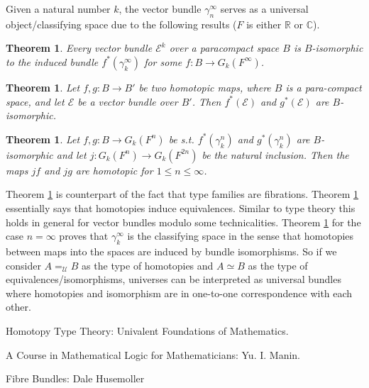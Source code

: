 \documentclass[10pt]{article}
\theoremstyle{definition}
\theoremstyle{plain}
\newtheorem{theorem}[definition]{Theorem}
\theoremstyle{remark}
\newcommand{\U}{\mathscr{U}}
\begin{document}
Given a natural number $k$, the vector bundle $\gamma^{\infty }_n$ serves as a 
universal object/classifying space due to the following results 
($F$ is either $\mathbb{R}$ or $\mathbb{C}$).

\begin{theorem}\label{T:Ind}
Every vector bundle $\mathscr{E}^k$ over a paracompact space $B$ is $B$-isomorphic
to the induced bundle $f^*(\gamma^{\infty}_k)$ for some ${f : B \to G_k (F^{ \infty })}$.
\end{theorem}

\begin{theorem}\label{T:Hom to Eq}
Let $f, g: B \to B'$ be two homotopic maps, where $B$ is a para-compact space, 
and let $\mathscr{E}$ be a vector bundle over $B'$. Then $f^*(\mathscr{E})$ and 
$g^*(\mathscr{E})$ are $B$-isomorphic.
\end{theorem}

\begin{theorem}\label{T:Eq to Hom}
Let $f, g: B \to G_k(F^n)$ be s.t. $f^*(\gamma_k^n)$ and $g^*(\gamma_k^n)$
are $B$-isomorphic and let ${ j: G_k(F^n) \to G_k(F^{2n}) }$ be the natural inclusion. Then the
maps $jf$ and $jg$ are homotopic for $1 \leq n \leq \infty$. 
\end{theorem}

Theorem \ref{T:Ind} is counterpart of the fact that type families are fibrations. Theorem
\ref{T:Hom to Eq} essentially says that homotopies induce equivalences. Similar to type theory
this holds in general for vector bundles modulo some technicalities. Theorem \ref{T:Eq to Hom}
for the case $n = \infty$ proves that $\gamma^{\infty}_k$ is the classifying space in the 
sense that homotopies between maps into the spaces are induced by bundle isomorphisms.
So if we consider $A =_{\U} B$ as the type of homotopies and $A \simeq B$ as the type of
equivalences/isomorphisms, universes can be interpreted as universal bundles where homotopies
and isomorphism are in one-to-one correspondence with each other.
 


\begin{thebibliography}{99}

Homotopy Type Theory: Univalent Foundations of Mathematics.

A Course in Mathematical Logic for Mathematicians: Yu. I. Manin. 

Fibre Bundles: Dale Husemoller

\end{thebibliography}
\end{document}
